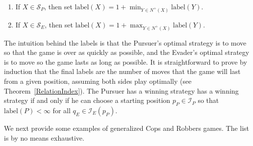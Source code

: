 \documentclass[12pt,reqno]{amsart}
\begin{document}
\begin{enumerate}
\item If $X \in \mathcal{S}_P$, then set $\mathrm{label}(X) = 1 + \min_{Y \in N^+(X)}\mathrm{label}(Y)$.
\item If $X \in \mathcal{S}_E$, then set $\mathrm{label}(X) = 1 + \max_{Y \in N^+(X)}\mathrm{label}(Y)$.
\end{enumerate}
The intuition behind the labels is that the Pursuer's optimal strategy is to move so that the game is over as quickly as possible, and the Evader's optimal strategy is to move so the game lasts as
long as possible. It is straightforward to prove by induction that the final labels are the number of moves that the game will last from a given position, assuming both sides play optimally (see
Theorem~\ref{RelationIndex}).  The Pursuer has a winning strategy has a winning strategy if and only if he can choose a starting position $p_P \in \mathcal{I}_P$ so that $\mathrm{label}(P) < \infty$
for all $q_E \in \mathcal{I}_E(p_P)$.

We next provide some examples of generalized Cops and Robbers games. The list is by no means exhaustive.
\end{document}
